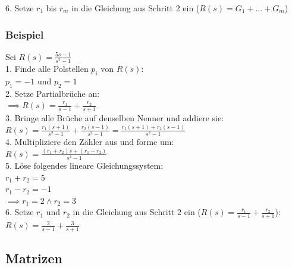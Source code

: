 \documentclass[10pt,a4paper]{article}
\begin{document}
6. Setze $r_1$ bis $r_m$ in die Gleichung aus Schritt 2 ein ($R(s) = G_1 + \dots + G_m$)

%
%

\subsubsection{Beispiel}
Sei $R(s) = \frac{5s-1}{s^2-1}$ \\

1. Finde alle Polstellen $p_i$ von $R(s):$ \\
$p_1 = -1$ und $p_2 = 1$ \\

2. Setze Partialbrüche an: \\
$\implies R(s) = \frac {r_1} {s - 1} + \frac {r_2} {s + 1}$ \\

3. Bringe alle Brüche auf denselben Nenner und addiere sie: \\
$R(s) = \frac{r_1(s + 1)}{s^2-1} + \frac{r_2(s - 1)}{s^2-1} = \frac{r_1(s + 1) + r_2(s - 1)}{s^2-1}$\\

4. Multipliziere den Zähler aus und forme um: \\
$ R(s) = \frac{(r_1 + r_2)s + (r_1 - r_2)}{s^2-1}$ \\

5. Löse folgendes lineare Gleichungssystem: \\
$r_1 + r_2 = 5$ \\
$r_1 - r_2 = -1$ \\
$\implies r_1 = 2 \land r_2 = 3$ \\

6. Setze $r_1$ und $r_2$ in die Gleichung aus Schritt 2 ein ($R(s) = \frac {r_1} {s - 1} + \frac {r_2} {s + 1}$): \\
$R(s) = \frac {2} {s - 1} + \frac {3} {s + 1}$

\subsection{Matrizen}
\end{document}
